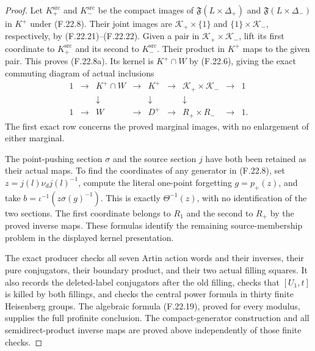 \begin{proof}
Let $K_+^{\mathrm{src}}$ and $K_-^{\mathrm{src}}$
be the compact images of
$\mathfrak F(L\times\Delta_+)$ and
$\mathfrak F(L\times\Delta_-)$ in $K^+$
under (F.22.8). Their joint images are
$\mathcal K_+\times\{1\}$ and
$\{1\}\times\mathcal K_-$, respectively,
by (F.22.21)--(F.22.22).
Given a pair in $\mathcal K_+\times\mathcal K_-$,
lift its first coordinate to $K_+^{\mathrm{src}}$
and its second to $K_-^{\mathrm{src}}$.
Their product in $K^+$ maps to the given pair.
This proves (F.22.8a). Its kernel is
$K^+\cap W$ by (F.22.6), giving the exact
commuting diagram of actual inclusions
\[
 \begin{array}{ccccccccc}
 1&\longrightarrow&K^+\cap W&\longrightarrow&K^+
     &\longrightarrow&\mathcal K_+\times\mathcal K_-
     &\longrightarrow&1\\
 &&\downarrow&&\downarrow&&\downarrow\\
 1&\longrightarrow&W&\longrightarrow&D^+
     &\longrightarrow&R_+\times R_-
     &\longrightarrow&1 .
 \end{array}                                                  \tag{F.22.23}
\]
The first exact row concerns the proved marginal
images, with no enlargement of either marginal.

The point-pushing section $\sigma$ and the
source section $j$ have both been retained
as their actual maps. To find the coordinates
of any generator in (F.22.8), set
$z=j(l)\nu_dj(l)^{-1}$, compute the literal
one-point forgetting $g=p_+(z)$, and take
$b=\iota^{-1}(z\sigma(g)^{-1})$.
This is exactly $\Theta^{-1}(z)$, with no
identification of the two sections.
The first coordinate belongs to $R_1$ and
the second to $R_+$ by the proved inverse
maps. These formulas identify the remaining
source-membership problem in the displayed
kernel presentation.

The exact producer
checks all seven Artin action words and
their inverses, their pure conjugators,
their boundary product, and their two
actual filling squares. It also records
the deleted-label conjugators after the
old filling, checks that $[U_1,t]$ is
killed by both fillings, and checks the
central power formula in thirty finite
Heisenberg groups. The algebraic formula
(F.22.19), proved for every modulus,
supplies the full profinite conclusion.
The compact-generator construction and
all semidirect-product inverse maps are
proved above independently of those
finite checks.
\end{proof}
